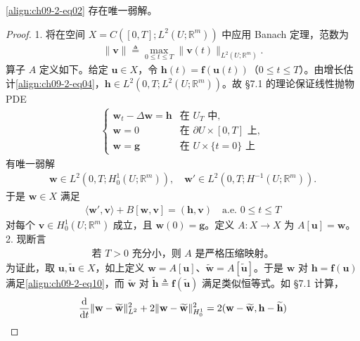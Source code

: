 \documentclass[../../main.tex]{subfiles}
\begin{document}
\begin{example}[反应扩散方程]
\begin{theorem}[存在性]\label{theorem:ch09-2-2-反应扩散存在}
\eqref{align:ch09-2-eq02} 存在唯一弱解。
\begin{proof}
1. 将在空间 $X=C([0,T];L^2(U;\mathbb{R}^m))$ 中应用 Banach 定理，范数为
\begin{align*}
\|\mathbf{v}\|\triangleq\max_{0\leqslant t\leqslant T}\|\mathbf{v}(t)\|_{L^2(U;\mathbb{R}^m)}.
\end{align*}
算子 $A$ 定义如下。给定 $\mathbf{u}\in X$，令 $\mathbf{h}(t)=\mathbf{f}(\mathbf{u}(t))$（$0\leqslant t\leqslant T$）。由增长估计\eqref{align:ch09-2-eq04}，$\mathbf{h}\in L^2(0,T;L^2(U;\mathbb{R}^m))$。故 \S7.1 的理论保证线性抛物 PDE
\begin{align}
\begin{cases}
\mathbf{w}_t-\Delta\mathbf{w}=\mathbf{h}&\text{在 }U_T\text{ 中},\\
\mathbf{w}=0&\text{在 }\partial U\times[0,T]\text{ 上},\\
\mathbf{w}=\mathbf{g}&\text{在 }U\times\{t=0\}\text{ 上}
\end{cases}\label{align:ch09-2-eq08}
\end{align}
有唯一弱解
\begin{align}
\mathbf{w}\in L^2(0,T;H_0^1(U;\mathbb{R}^m)),\quad \mathbf{w}'\in L^2(0,T;H^{-1}(U;\mathbb{R}^m)).\label{align:ch09-2-eq09}
\end{align}
于是 $\mathbf{w}\in X$ 满足
\begin{align}
\langle\mathbf{w}',\mathbf{v}\rangle+B[\mathbf{w},\mathbf{v}]=(\mathbf{h},\mathbf{v})\quad\text{a.e. }0\leqslant t\leqslant T\label{align:ch09-2-eq10}
\end{align}
对每个 $\mathbf{v}\in H_0^1(U;\mathbb{R}^m)$ 成立，且 $\mathbf{w}(0)=\mathbf{g}$。定义 $A:X\to X$ 为 $A[\mathbf{u}]=\mathbf{w}$。
2. 现断言
\begin{align}
\text{若 }T>0\text{ 充分小，则 }A\text{ 是严格压缩映射。}\label{align:ch09-2-eq11}
\end{align}
为证此，取 $\mathbf{u},\widetilde{\mathbf{u}}\in X$，如上定义 $\mathbf{w}=A[\mathbf{u}]$、$\widetilde{\mathbf{w}}=A[\widetilde{\mathbf{u}}]$。于是 $\mathbf{w}$ 对 $\mathbf{h}=\mathbf{f}(\mathbf{u})$ 满足\eqref{align:ch09-2-eq10}，而 $\widetilde{\mathbf{w}}$ 对 $\widetilde{\mathbf{h}}\triangleq\mathbf{f}(\widetilde{\mathbf{u}})$ 满足类似恒等式。如 \S7.1 计算，
\begin{align}
\frac{\mathrm{d}}{\mathrm{d}t}\|\mathbf{w}-\widetilde{\mathbf{w}}\|_{L^2}^2+2\|\mathbf{w}-\widetilde{\mathbf{w}}\|_{H_0^1}^2&=2(\mathbf{w}-\widetilde{\mathbf{w}},\mathbf{h}-\widetilde{\mathbf{h}})\notag\\

\end{align}
\end{proof}
\end{theorem}
\end{example}
\end{document}
